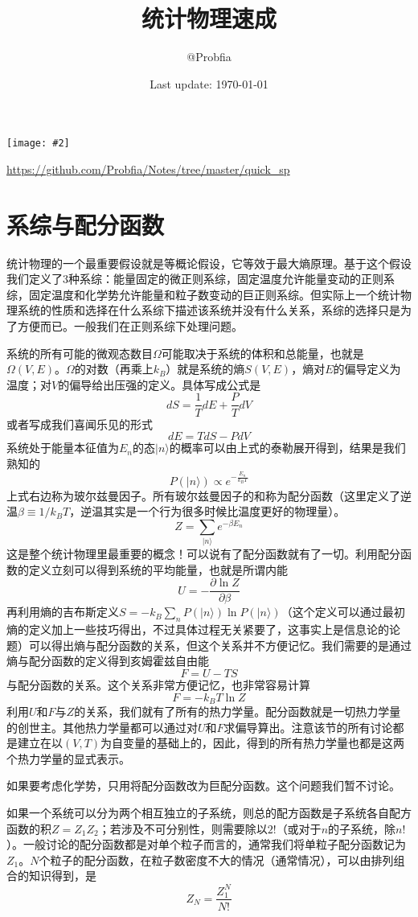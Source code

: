 \documentclass[a4paper,11pt]{ctexart}
\title{\bf 统计物理速成}
\author{@Probfia}
\date{Last update: \today}
\newcommand{\beq}{\begin{equation}}
\newcommand{\eeq}{\end{equation}}
\newcommand{\cpic}[2]{
\begin{center}
\texttt{[image: \#2]}
\end{center}
}
\begin{document}
\begin{titlepage}
\maketitle
\cpic{0.07}{hotpot}

\vspace{11cm}
{\centering \small
\url{https://github.com/Probfia/Notes/tree/master/quick_sp}
}
\end{titlepage}
\tableofcontents

\section{系综与配分函数}
统计物理的一个最重要假设就是等概论假设，它等效于最大熵原理。基于这个假设我们定义了3种系综：能量固定的微正则系综，固定温度允许能量变动的正则系综，固定温度和化学势允许能量和粒子数变动的巨正则系综。但实际上一个统计物理系统的性质和选择在什么系综下描述该系统并没有什么关系，系综的选择只是为了方便而已。一般我们在正则系综下处理问题。
\par
系统的所有可能的微观态数目$\varOmega$可能取决于系统的体积和总能量，也就是$\varOmega(V,E)$。$\varOmega$的对数（再乘上$k_B$）就是系统的熵$S(V,E)$，熵对$E$的偏导定义为温度；对$V$的偏导给出压强的定义。具体写成公式是
\beq
dS = \frac{1}{T}dE + \frac{P}{T} dV
\eeq
或者写成我们喜闻乐见的形式
\beq
dE = TdS - PdV
\eeq
系统处于能量本征值为$E_n$的态$|n\rangle$的概率可以由上式的泰勒展开得到，结果是我们熟知的
\beq
P(|n\rangle) \propto e^{-\frac{E_n}{k_B T}}
\eeq
上式右边称为玻尔兹曼因子。所有玻尔兹曼因子的和称为配分函数（这里定义了逆温$\beta \equiv 1/k_B T$，逆温其实是一个行为很多时候比温度更好的物理量）。
\beq
Z = \sum_{|n\rangle} e^{-\beta E_n}
\eeq
这是整个统计物理里最重要的概念！可以说有了配分函数就有了一切。利用配分函数的定义立刻可以得到系统的平均能量，也就是所谓内能
\beq
U = - \frac{\partial \ln Z}{\partial \beta}
\eeq
再利用熵的吉布斯定义$S = - k_B \sum_n P(|n\rangle) \ln P(|n\rangle)$（这个定义可以通过最初熵的定义加上一些技巧得出，不过具体过程无关紧要了，这事实上是信息论的论题）可以得出熵与配分函数的关系，但这个关系并不方便记忆。我们需要的是通过熵与配分函数的定义得到亥姆霍兹自由能
\beq
F = U - TS
\eeq
与配分函数的关系。这个关系非常方便记忆，也非常容易计算
\beq
F= - k_B T \ln Z
\eeq
利用$U$和$F$与$Z$的关系，我们就有了所有的热力学量。{\color{red}配分函数就是一切热力学量的创世主}。其他热力学量都可以通过对$U$和$F$求偏导算出。注意该节的所有讨论都是建立在以$(V,T)$为自变量的基础上的，因此，得到的所有热力学量也都是这两个热力学量的显式表示。
\par
如果要考虑化学势，只用将配分函数改为巨配分函数。这个问题我们暂不讨论。
\par
如果一个系统可以分为两个相互独立的子系统，则总的配方函数是子系统各自配方函数的积$Z = Z_1 Z_2$；若涉及不可分别性，则需要除以$2!$（或对于$n$的子系统，除$n!$）。一般讨论的配分函数都是对单个粒子而言的，通常我们将单粒子配分函数记为$Z_1$。$N$个粒子的配分函数，在粒子数密度不大的情况（通常情况），可以由排列组合的知识得到，是
\beq
Z_N  =\frac{Z_1^N}{N!}
\eeq
\end{document}
